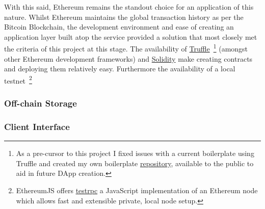 With this said, Ethereum remains the standout choice for an application of this nature. Whilst Ethereum maintains the global transaction history as per the Bitcoin Blockchain, the development environment and ease of creating an application layer built atop the service provided a solution that most closely met the criteria of this project at this stage. The availability of \href{https://github.com/trufflesuite/truffle}{Truffle}~\footnote{As a pre-cursor to this project I fixed issues with a current boilerplate using Truffle and created my own boilerplate \href{https://github.com/FreddieLindsey/truffle-webpack-boilerplate}{repository}, available to the public to aid in future DApp creation.} (amongst other Ethereum development frameworks) and \href{https://github.com/ethereum/solidity}{Solidity} make creating contracts and deploying them relatively easy. Furthermore the availability of a local testnet~\footnote{EthereumJS offers \href{https://github.com/ethereumjs/testrpc}{testrpc} a JavaScript implementation of an Ethereum node which allows fast and extensible private, local node setup.}

\subsubsection{Off-chain Storage}



\subsubsection{Client Interface}


